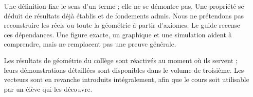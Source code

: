 \documentclass[11pt,a4paper,oneside]{book}
\begin{document}
\begin{attention}
Une définition fixe le sens d'un terme ; elle ne se démontre pas. Une propriété se déduit de résultats déjà établis et de fondements admis. Nous ne prétendons pas reconstruire les réels ou toute la géométrie à partir d'axiomes. Le guide recense ces dépendances. Une figure exacte, un graphique et une simulation aident à comprendre, mais ne remplacent pas une preuve générale.
\end{attention}
Les résultats de géométrie du collège sont réactivés au moment où ils servent ; leurs démonstrations détaillées sont disponibles dans le volume de troisième. Les vecteurs sont en revanche introduits intégralement, afin que le cours soit utilisable par un élève qui les découvre.
\tableofcontents
\mainmatter
























\end{document}

